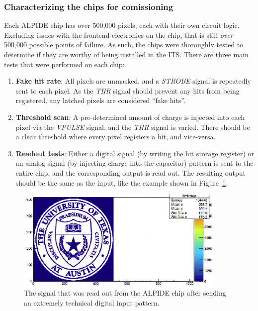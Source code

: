 \subsubsection{Characterizing the chips for comissioning}
\label{sec:hardware_testing}

Each ALPIDE chip has over 500,000 pixels, each with their own circuit logic. Excluding issues with the frontend electronics on the chip, that is still \textit{over} 500,000 possible points of failure. As such, the chips were thoroughly tested to determine if they are worthy of being installed in the ITS. There are three main tests that were performed on each chip:
\begin{enumerate}
    \item \textbf{Fake hit rate}: All pixels are unmasked, and a \textit{STROBE} signal is repeatedly sent to each pixel. As the \textit{THR} signal should prevent any hits from being registered, any latched pixels are considered ``fake hits''.
    \item \textbf{Threshold scan}: A pre-determined amount of charge is injected into each pixel via the \textit{VPULSE} signal, and the \textit{THR} signal is varied. There should be a clear threshold where every pixel registers a hit, and vice-versa.
    \item \textbf{Readout tests}: Either a digital signal (by writing the hit storage register) or an analog signal (by injecting charge into the capacitor) pattern is sent to the entire chip, and the corresponding output is read out. The resulting output should be the same as the input, like the example shown in Figure~\ref{fig:ut_alpide}.
\end{enumerate}

\begin{figure}
    \centering
    \includegraphics[width=0.9\textwidth]{figures/experiment/ut_alpide.png}
    \caption{The signal that was read out from the ALPIDE chip after sending an extremely technical digital input pattern.}
    \label{fig:ut_alpide}
\end{figure}

